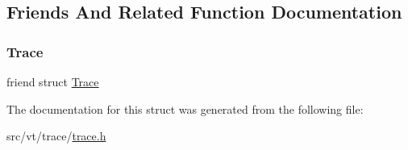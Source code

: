 \subsection{Friends And Related Function Documentation}
\mbox{\label{structvt_1_1trace_1_1_trace_processing_tag_a2e6db6037effb09584d7eba75b16dec4}} 
\subsubsection{\texorpdfstring{Trace}{Trace}}
{\footnotesize\ttfamily friend struct \hyperlink{structvt_1_1trace_1_1_trace}{Trace}\hspace{0.3cm}{\ttfamily [friend]}}



The documentation for this struct was generated from the following file\+:\begin{DoxyCompactItemize}
\item 
src/vt/trace/\hyperlink{trace_8h}{trace.\+h}\end{DoxyCompactItemize}
